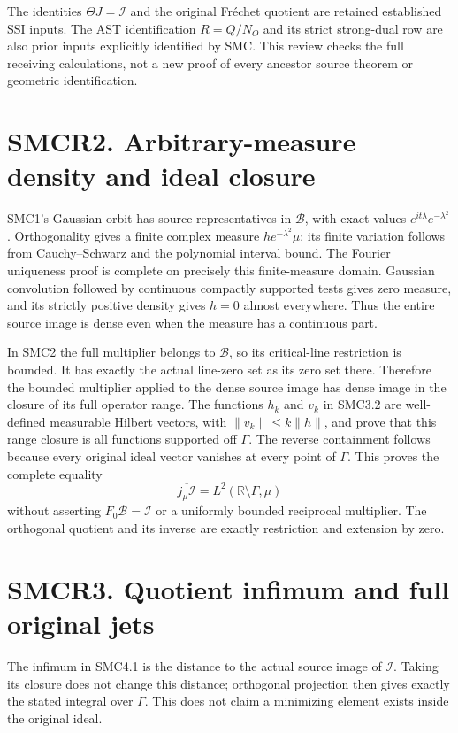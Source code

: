 The identities \(\Theta J=\mathcal I\) and the original Fréchet quotient
are retained established SSI inputs. The AST identification \(R=Q/N_O\)
and its strict strong-dual row are also prior inputs explicitly
identified by SMC. This review checks the full receiving calculations,
not a new proof of every ancestor source theorem or geometric
identification.

\section{SMCR2. Arbitrary-measure density and ideal
closure}\label{smcr2.-arbitrary-measure-density-and-ideal-closure}

SMC1's Gaussian orbit has source representatives in \(\mathcal B\), with
exact values \(e^{it\lambda}e^{-\lambda^2}\). Orthogonality gives a
finite complex measure \(h e^{-\lambda^2}\mu\): its finite variation
follows from Cauchy--Schwarz and the polynomial interval bound. The
Fourier uniqueness proof is complete on precisely this finite-measure
domain. Gaussian convolution followed by continuous compactly supported
tests gives zero measure, and its strictly positive density gives
\(h=0\) almost everywhere. Thus the entire source image is dense even
when the measure has a continuous part.

In SMC2 the full multiplier belongs to \(\mathcal B\), so its
critical-line restriction is bounded. It has exactly the actual
line-zero set as its zero set there. Therefore the bounded multiplier
applied to the dense source image has dense image in the closure of its
full operator range. The functions \(h_k\) and \(v_k\) in SMC3.2 are
well-defined measurable Hilbert vectors, with \(\|v_k\|\le k\|h\|\), and
prove that this range closure is all functions supported off \(\Gamma\).
The reverse containment follows because every original ideal vector
vanishes at every point of \(\Gamma\). This proves the complete equality
\[
\overline{j_\mu\mathcal I}=L^2(\mathbb R\setminus\Gamma,\mu)
\] without asserting \(F_0\mathcal B=\mathcal I\) or a uniformly bounded
reciprocal multiplier. The orthogonal quotient and its inverse are
exactly restriction and extension by zero.

\section{SMCR3. Quotient infimum and full original
jets}\label{smcr3.-quotient-infimum-and-full-original-jets}

The infimum in SMC4.1 is the distance to the actual source image of
\(\mathcal I\). Taking its closure does not change this distance;
orthogonal projection then gives exactly the stated integral over
\(\Gamma\). This does not claim a minimizing element exists inside the
original ideal.

